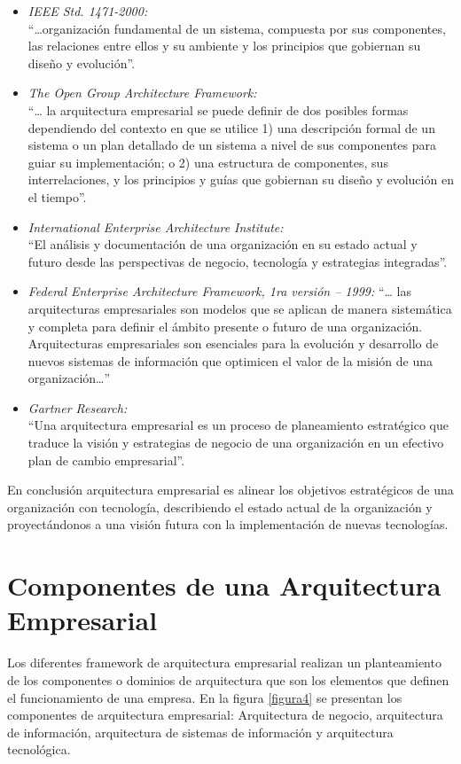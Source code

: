   \begin{itemize}
	\item \textit{IEEE Std. 1471-2000:} \\
	“…organización fundamental de un sistema, compuesta por sus componentes, las relaciones entre ellos y su ambiente y los principios que gobiernan su diseño y evolución”.
	\item \textit{The Open Group Architecture Framework:} \\
	“… la arquitectura empresarial se puede definir de dos posibles formas dependiendo del contexto en que se utilice 1) una descripción formal de un sistema o un plan detallado de un sistema a nivel de sus componentes para guiar su implementación; o 2) una estructura de componentes, sus interrelaciones, y los principios y guías que gobiernan su diseño y evolución en el tiempo”.
	\item \textit{International Enterprise Architecture Institute:} \\
	“El análisis y documentación de una organización en su estado actual y futuro desde las perspectivas de negocio, tecnología y estrategias integradas”.
	\item \textit{Federal Enterprise Architecture Framework, 1ra versión – 1999:}
	“… las arquitecturas empresariales son modelos que se aplican de manera sistemática y completa para definir el ámbito presente o futuro de una organización. Arquitecturas empresariales son esenciales para la evolución y desarrollo de nuevos sistemas de información que optimicen el valor de la misión de una organización…”
	\item \textit{Gartner Research:} \\
	“Una arquitectura empresarial es un proceso de planeamiento estratégico que traduce la visión y estrategias de negocio de una organización en un efectivo plan de cambio empresarial”.
  \end{itemize}

  En conclusión arquitectura empresarial es alinear los objetivos estratégicos de una organización con tecnología, describiendo el estado actual de la organización y proyectándonos a una visión futura con la implementación de nuevas tecnologías.
  
\section{Componentes de una Arquitectura Empresarial}
Los diferentes framework de arquitectura empresarial realizan un planteamiento de los componentes o dominios de arquitectura que son los elementos que definen el funcionamiento de una empresa. En la figura \ref{figura4} se presentan los componentes de arquitectura empresarial: Arquitectura de negocio, arquitectura de información, arquitectura de sistemas de información y arquitectura tecnológica.
  
